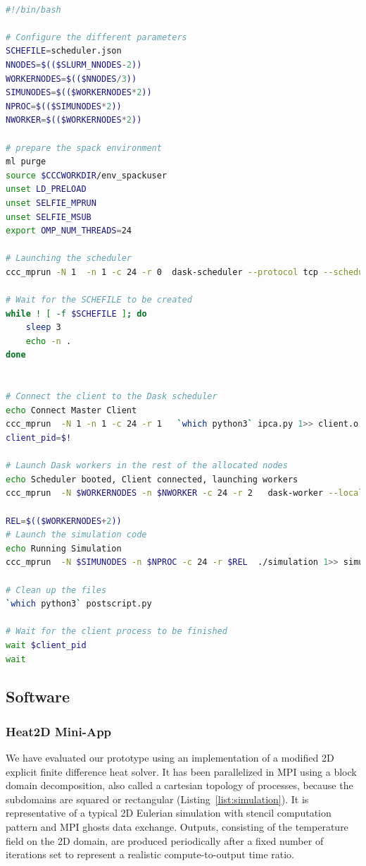\begin{lstlisting}[float, label=list:scriptIrene, language=bash, caption=Submission script of simulation and in situ analytics in Irene supercomputer]

#!/bin/bash

# Configure the different parameters 
SCHEFILE=scheduler.json
NNODES=$(($SLURM_NNODES-2))
WORKERNODES=$(($NNODES/3))
SIMUNODES=$(($WORKERNODES*2))
NPROC=$(($SIMUNODES*2))                  
NWORKER=$(($WORKERNODES*2))

# prepare the spack environment
ml purge
source $CCCWORKDIR/env_spackuser
unset LD_PRELOAD
unset SELFIE_MPRUN
unset SELFIE_MSUB
export OMP_NUM_THREADS=24

# Launching the scheduler
ccc_mprun -N 1  -n 1 -c 24 -r 0  dask-scheduler --protocol tcp --scheduler-file=$SCHEFILE 1>> scheduler.o  2>> scheduler.e  &

# Wait for the SCHEFILE to be created 
while ! [ -f $SCHEFILE ]; do
    sleep 3
    echo -n .
done


# Connect the client to the Dask scheduler
echo Connect Master Client  
ccc_mprun  -N 1 -n 1 -c 24 -r 1   `which python3` ipca.py 1>> client.o 2>> client.e &
client_pid=$!

# Launch Dask workers in the rest of the allocated nodes 
echo Scheduler booted, Client connected, launching workers 
ccc_mprun  -N $WORKERNODES -n $NWORKER -c 24 -r 2   dask-worker --local-directory /tmp  --scheduler-file=${SCHEFILE} 1>> worker.o 2>>worker.e  &
     
REL=$(($WORKERNODES+2))
# Launch the simulation code
echo Running Simulation 
ccc_mprun  -N $SIMUNODES -n $NPROC -c 24 -r $REL  ./simulation 1>> simulation.o 2>> simulation.e 

# Clean up the files 
`which python3` postscript.py

# Wait for the client process to be finished 
wait $client_pid
wait 
\end{lstlisting}

\subsection{Software}
\subsubsection{Heat2D Mini-App}
We have evaluated our prototype using an implementation of a modified 2D explicit finite difference heat solver. It has been parallelized in MPI using a block domain decomposition, also called a cartesian topology of processes, because the subdomains are squared or rectangular (Listing~\ref{list:simulation}).   
It is representative of a typical 2D Eulerian simulation with stencil computation pattern and MPI ghosts data exchange. Outputs, consisting of the temperature field on the 2D domain, are produced periodically after a fixed number of iterations set to represent a realistic compute-to-output time ratio. 


